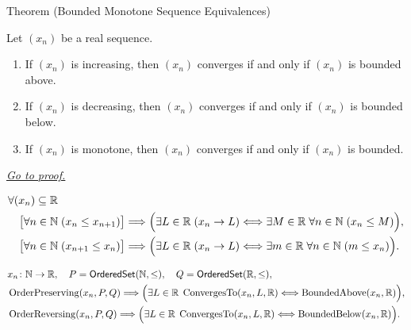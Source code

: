 \begin{theorembox}{Theorem (Bounded Monotone Sequence Equivalences)}
\begin{theorem}
\label{thm:bounded-monotone-sequence-equivalences}
Let $(x_n)$ be a real sequence.
\begin{enumerate}[label=(\alph*)]
  \item If $(x_n)$ is increasing, then $(x_n)$ converges if and only if
  $(x_n)$ is bounded above.
  \item If $(x_n)$ is decreasing, then $(x_n)$ converges if and only if
  $(x_n)$ is bounded below.
  \item If $(x_n)$ is monotone, then $(x_n)$ converges if and only if
  $(x_n)$ is bounded.
\end{enumerate}

\smallskip
\noindent
\hyperref[prf:bounded-monotone-sequence-equivalences]{\textit{Go to proof.}}
\end{theorem}
\end{theorembox}

\begin{remark*}
\[
\begin{aligned}
&\forall (x_n)\subseteq\mathbb{R}\\
&\quad
\bigl[\forall n\in\mathbb{N}\;(x_n\le x_{n+1})\bigr]
\Longrightarrow
\Bigl(
  \exists L\in\mathbb{R}\;(x_n\to L)
  \Longleftrightarrow
  \exists M\in\mathbb{R}\;\forall n\in\mathbb{N}\;(x_n\le M)
\Bigr),\\
&\quad
\bigl[\forall n\in\mathbb{N}\;(x_{n+1}\le x_n)\bigr]
\Longrightarrow
\Bigl(
  \exists L\in\mathbb{R}\;(x_n\to L)
  \Longleftrightarrow
  \exists m\in\mathbb{R}\;\forall n\in\mathbb{N}\;(m\le x_n)
\Bigr).
\end{aligned}
\]
\end{remark*}

\begin{remark*}
\[
\begin{aligned}
&x_n\colon\mathbb{N}\to\mathbb{R},\quad
P=\mathsf{OrderedSet}(\mathbb{N},\leq),\quad
Q=\mathsf{OrderedSet}(\mathbb{R},\leq),\\
&\operatorname{OrderPreserving}(x_n,P,Q)
\Longrightarrow
\Bigl(
\exists L\in\mathbb{R}\;\operatorname{ConvergesTo}(x_n,L,\mathbb{R})
\Longleftrightarrow
\operatorname{BoundedAbove}(x_n,\mathbb{R})
\Bigr),\\
&\operatorname{OrderReversing}(x_n,P,Q)
\Longrightarrow
\Bigl(
\exists L\in\mathbb{R}\;\operatorname{ConvergesTo}(x_n,L,\mathbb{R})
\Longleftrightarrow
\operatorname{BoundedBelow}(x_n,\mathbb{R})
\Bigr).
\end{aligned}
\]
\end{remark*}

